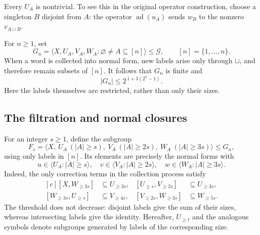 \documentclass[11pt,a4paper]{article}
\theoremstyle{definition}
\theoremstyle{remark}
\newcommand{\ad}{\operatorname{ad}}
\begin{document}
Every \(U_A\) is nontrivial.
To see this in the original operator construction,
choose a singleton \(B\) disjoint from \(A\):
the operator \(\ad(u_A)\) sends \(w_B\) to the nonzero \(v_{A\cup B}\).

For \(n\ge1\), set
\[
 G_n=\langle X,U_A,V_A,W_A:\varnothing\ne A\subseteq[n]\rangle
 \le\mathscr G,\qquad [n]=\{1,\ldots,n\}.
\]
When a word is collected into normal form, new labels arise
only through \(\sqcup\), and therefore remain subsets of \([n]\).
It follows that \(G_n\) is finite and
\begin{equation}\label{eq:sizefirst}
 |G_n|\le2^{\,1+3(2^n-1)}.
\end{equation}
Here the labels themselves are restricted, rather than only their sizes.

\subsection{The filtration and normal closures}

For an integer \(s\ge1\), define the subgroup
\[
 F_s=\langle X,\ U_A\ (|A|\ge s),\
 V_A\ (|A|\ge2s),\ W_A\ (|A|\ge3s)\rangle\le G_n,
\]
using only labels in \([n]\).
Its elements are precisely the normal forms with
\[
 u\in\langle U_A:|A|\ge s\rangle,\quad
 v\in\langle V_A:|A|\ge2s\rangle,\quad
 w\in\langle W_A:|A|\ge3s\rangle.
\]
Indeed, the only correction terms in the collection process satisfy
\[
 \begin{aligned}[c]
 [X,W_{\ge3s}]&\subseteq U_{\ge3s},&
 [U_{\ge s},V_{\ge2s}]&\subseteq U_{\ge3s},\\
 [W_{\ge3s},U_{\ge s}]&\subseteq V_{\ge4s},&
 [V_{\ge2s},W_{\ge3s}]&\subseteq W_{\ge5s}.
 \end{aligned}
\]
The threshold does not decrease: disjoint labels give the sum
of their sizes, whereas intersecting labels give the identity.
Hereafter, \(U_{\ge t}\) and the analogous symbols denote subgroups
generated by labels of the corresponding size.
\end{document}
